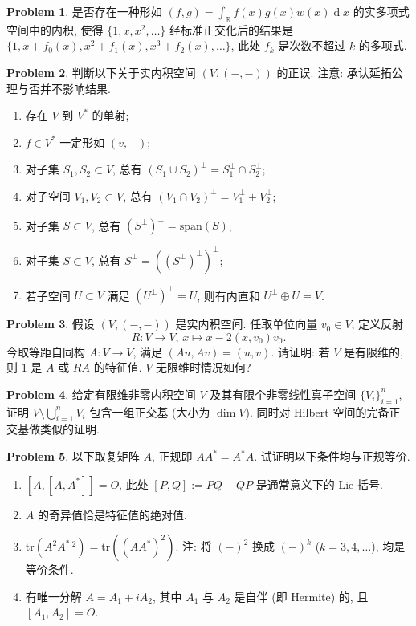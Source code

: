 \documentclass{MainStyle}
\theoremstyle{definition}
\newtheorem{problem}{Problem}
\begin{document}
\begin{problem}
是否存在一种形如 $(f,g)=\int_{\mathbb R}f(x)g(x)w(x)\operatorname dx$ 的实多项式空间中的内积, 使得 $\{1,x,x^2,\ldots\}$ 经标准正交化后的结果是 $\{1,x+f_0(x),x^2+f_1(x),x^3+f_2(x),\ldots\}$, 此处 $f_k$ 是次数不超过 $k$ 的多项式.
\end{problem}

\begin{problem}
判断以下关于实内积空间 $(V,(-,-))$ 的正误. 注意: 承认延拓公理与否并不影响结果.
\begin{enumerate}
    \item 存在 $V$ 到 $V^\ast$ 的单射;
    \item $f\in V^\ast$ 一定形如 $(v,-)$;
    \item 对子集 $S_1,S_2\subset V$, 总有 $(S_1\cup S_2)^\perp= S_1^\perp \cap S_2^\perp$;
    \item 对子空间 $V_1,V_2\subset V$, 总有 $(V_1\cap V_2)^\perp =V_1^\perp +V_2^\perp$;
    \item 对子集 $S\subset V$, 总有 $(S^\perp )^\perp =\mathrm{span}(S)$;
    \item 对子集 $S\subset V$, 总有 $S^\perp =((S^\perp)^\perp)^\perp$;
    \item 若子空间 $U\subset V$ 满足 $(U^\perp)^\perp=U$, 则有内直和 $U^\perp \oplus U=V$.
\end{enumerate}
\end{problem}

\begin{problem}
假设 $(V,(-,-))$ 是实内积空间. 任取单位向量 $v_0\in V$, 定义反射
\begin{equation}
    R:V\to V,\,x\mapsto x-2(x,v_0)v_0.
\end{equation}
今取等距自同构 $A:V\to V$, 满足 $(Au,Av)=(u,v)$. 请证明: 若 $V$ 是有限维的, 则 $1$ 是 $A$ 或 $RA$ 的特征值. $V$ 无限维时情况如何?
\end{problem}

\begin{problem}
给定有限维非零内积空间 $V$ 及其有限个非零线性真子空间 $\{V_i\}_{i=1}^n$, 证明 $V\setminus\bigcup_{i=1}^nV_i$ 包含一组正交基 (大小为 $\dim V$). 同时对 Hilbert 空间的完备正交基做类似的证明.
\end{problem}

\begin{problem}
以下取复矩阵 $A$, 正规即 $AA^\ast =A^\ast A$. 试证明以下条件均与正规等价.
\begin{enumerate}
    \item $[A,[A,A^\ast]]=O$, 此处 $[P,Q]:=PQ-QP$ 是通常意义下的 Lie 括号.
    \item $A$ 的奇异值恰是特征值的绝对值.
    \item $\mathrm{tr}(A^2A^\ast\,^2 )=\mathrm{tr}((AA^\ast)^2)$. 注: 将 $(-)^2$ 换成 $(-)^k$ ($k=3,4,\ldots$), 均是等价条件.
    \item 有唯一分解 $A=A_1+iA_2$, 其中 $A_1$ 与 $A_2$ 是自伴 (即 Hermite) 的, 且 $[A_1,A_2]=O$.
\end{enumerate}
\end{problem}
\end{document}

